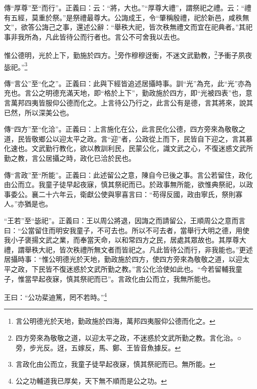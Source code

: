 {\noindent\zhuan{}\fzbyks 傳“厚尊”至“而行”。正義曰：云：“將，大也。”“厚尊大禮”，謂祭祀之禮。云：“禮有五經，莫重於祭。”是祭禮最尊大。公誨成王，令“肇稱殷禮，祀於新邑，咸秩無文”，欲答公誨己之事，還述公辭：“舉秩大祀，皆次秩無禮文而宜在祀典者。”其祀事非我所為，凡此皆待公而行者也。言公不可舍我以去也。 \par}

惟公德明，光於上下，勤施於四方。\footnote{言公明德光於天地，勤政施於四海，萬邦四夷服仰公德而化之。}旁作穆穆迓衡，不迷文武勤教，\footnote{四方旁來為敬敬之道，以迎太平之政，不迷惑於文武所勤之教。言化治。○旁，步光反。迓，五嫁反，馬、鄭、王皆音魚據反。}予衝子夙夜毖祀。”\footnote{言政化由公而立，我童子徒早起夜寐，慎其祭祀而已。無所能。}

{\noindent\zhuan{}\fzbyks 傳“言公”至“化之”。正義曰：此與下經皆追述居攝時事。訓“光”為充，此“光”亦為充也。言公之明德充滿天地，即“格於上下”，勤政施於四方，即“光被四表”也，意言萬邦四夷皆服仰公德而化之。上言待公乃行之，此言公有是德，言其將來，說其已然，所以深美公也。 \par}

{\noindent\zhuan{}\fzbyks 傳“四方”至“化洽”。正義曰：上言施化在公，此言民化公德，四方旁來為敬敬之道，民皆敬鄉公以迎太平之政。言“迎”者，公政從上而下，民皆自下迎之，言其慕化速也。文武勤行教化，欲以教訓利民，民蒙公化，識文武之心，不復迷惑文武所勤之教，言公居攝之時，政化已洽於民也。 \par}

{\noindent\zhuan{}\fzbyks 傳“言政”至“所能”。正義曰：此述留公之意，陳自今已後之事。言公若留住，政化由公而立。我童子徒早起夜寐，慎其祭祀而已。於政事無所能，欲惟典祭祀，以政事委公。襄二十六年云，衛獻公使與寧喜言曰：“苟得反國，政由寧氏，祭則寡人。”亦猶是也。 \par}

{\noindent\shu{}\fzkt “王若”至“毖祀”。正義曰：王以周公將退，因誨之而請留公，王順周公之意而言曰：“公當留住而明安我童子，不可去也。所以不可去者，當舉行大明之德，用使我小子褒揚文武之業，而奉當天命，以和常四方之民，居處其眾故也。其厚尊大禮，謂舉秩大祀，皆次秩禮所無文者而皆祀之。凡此皆待公而行，非我能也。”更述居攝時事：“惟公明德光於天地，勤政施於四方，使四方旁來為敬敬之道，以迎太平之政，下民皆不復迷惑於文武所勤之教。”言公化洽使如此也。“今若留輔我童子，惟當早起夜寐，慎其祭祀而已”。言政化由公而立，我無所能也。 \par}

王曰：“公功棐迪篤，罔不若時。”\footnote{公之功輔道我已厚矣，天下無不順而是公之功。}


